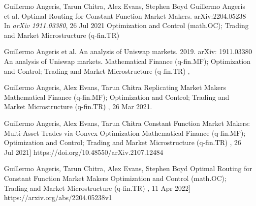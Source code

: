
\begin{thebibliography}{1}
Guillermo Angeris, Tarun Chitra, Alex Evans, Stephen Boyd
\newblock Guillermo Angeris et al. Optimal Routing for Constant Function Market Makers.	arXiv:2204.05238
\newblock In {\em arXiv 1911.03380}, 26 Jul 2021
Optimization and Control (math.OC); Trading and Market Microstructure (q-fin.TR)


Guillermo Angeris et al. An analysis of Uniswap markets. 2019. arXiv: 1911.03380
\newblock An analysis of Uniswap markets.
Mathematical Finance (q-fin.MF); Optimization and Control; Trading and Market Microstructure (q-fin.TR)
, 

Guillermo Angeris, Alex Evans, Tarun Chitra
\newblock Replicating Market Makers
Mathematical Finance (q-fin.MF); Optimization and Control; Trading and Market Microstructure (q-fin.TR)
, 26 Mar 2021.


Guillermo Angeris, Alex Evans, Tarun Chitra
\newblock Constant Function Market Makers: Multi-Asset Trades via Convex Optimization
Mathematical Finance (q-fin.MF); Optimization and Control; Trading and Market Microstructure (q-fin.TR)
, 26 Jul 2021]
https://doi.org/10.48550/arXiv.2107.12484


Guillermo Angeris, Tarun Chitra, Alex Evans, Stephen Boyd
\newblock Optimal Routing for Constant Function Market Makers
Optimization and Control (math.OC); Trading and Market Microstructure (q-fin.TR)
, 11 Apr 2022]
https://arxiv.org/abs/2204.05238v1

\end{thebibliography}
